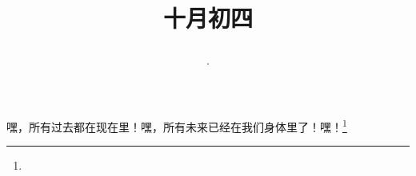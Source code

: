 \title{\date[d=4,m=11,y=2024][year:cn-y,年,month:cn,day:cn,日,·,weekday]·十月初四 }
嘿，所有过去都在现在里！嘿，所有未来已经在我们身体里了！嘿！\footnote{ }

